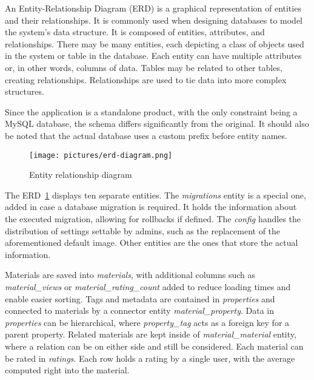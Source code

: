 \documentclass[
  digital,     %
  oneside,     %
  nosansbold,  %
  colorbold, %
  lof,         %
  lot,         %
]{fithesis4}
\begin{document}
An Entity-Relationship Diagram (ERD) is a graphical representation of entities and their relationships. It is commonly used when designing databases to model the system's data structure. It is composed of entities, attributes, and relationships. There may be many entities, each depicting a class of objects used in the system or table in the database. Each entity can have multiple attributes or, in other words, columns of data. Tables may be related to other tables, creating relationships. Relationships are used to tie data into more complex structures.

Since the application is a standalone product, with the only constraint being a MySQL database, the schema differs significantly from the original. It should also be noted that the actual database uses a custom prefix before entity names.

\begin{figure}
	\begin{center}
		\begin{minipage}{1\textwidth}
			\texttt{[image: pictures/erd-diagram.png]}
		\end{minipage}
	\end{center}
	\caption{Entity relationship diagram}
	\label{fig:erd}
\end{figure}

The ERD~\ref{fig:erd} displays ten separate entities. The \textit{migrations} entity is a special one, added in case a database migration is required. It holds the information about the executed migration, allowing for rollbacks if defined. The \textit{config} handles the distribution of settings settable by admins, such as the replacement of the aforementioned default image. Other entities are the ones that store the actual information.

Materials are saved into \textit{materials}, with additional columns such as \textit{material\_views} or \textit{material\_rating\_count} added to reduce loading times and enable easier sorting. Tags and metadata are contained in \textit{properties} and connected to materials by a connector entity \textit{material\_property}. Data in \textit{properties} can be hierarchical, where \textit{property\_tag} acts as a foreign key for a parent property. Related materials are kept inside of \textit{material\_material} entity, where a relation can be on either side and still be considered. Each material can be rated in \textit{ratings}. Each row holds a rating by a single user, with the average computed right into the material.
\end{document}
